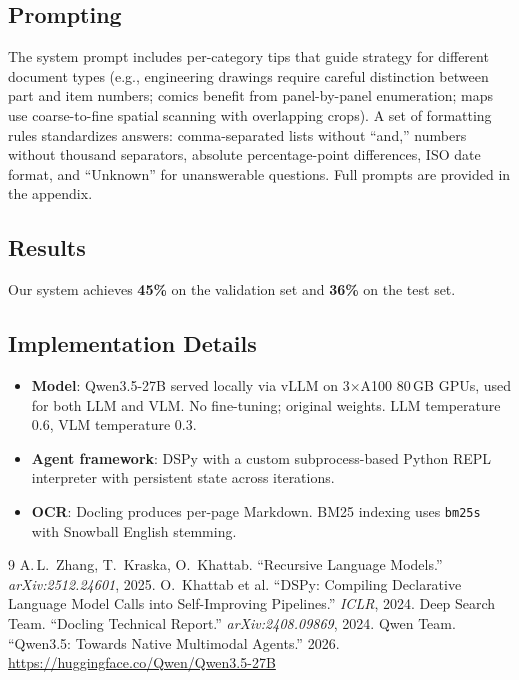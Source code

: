 \documentclass[10pt,twocolumn]{article}
\begin{document}
\subsection{Prompting}

The system prompt includes per-category tips that guide strategy for different document types (e.g., engineering drawings require careful distinction between part and item numbers; comics benefit from panel-by-panel enumeration; maps use coarse-to-fine spatial scanning with overlapping crops). A set of formatting rules standardizes answers: comma-separated lists without ``and,'' numbers without thousand separators, absolute percentage-point differences, ISO date format, and ``Unknown'' for unanswerable questions. Full prompts are provided in the appendix.

\subsection{Results}

Our system achieves \textbf{45\%} on the validation set and \textbf{36\%} on the test set.

\subsection{Implementation Details}

\begin{itemize}
  \item \textbf{Model}: Qwen3.5-27B served locally via vLLM on 3$\times$A100 80\,GB GPUs, used for both LLM and VLM. No fine-tuning; original weights. LLM temperature 0.6, VLM temperature 0.3.
  \item \textbf{Agent framework}: DSPy with a custom subprocess-based Python REPL interpreter with persistent state across iterations.
  \item \textbf{OCR}: Docling produces per-page Markdown. BM25 indexing uses \texttt{bm25s} with Snowball English stemming.
\end{itemize}

\begingroup
\footnotesize
\begin{thebibliography}{9}
 A.\,L.~Zhang, T.~Kraska, O.~Khattab. ``Recursive Language Models.'' \textit{arXiv:2512.24601}, 2025.
 O.~Khattab et al. ``DSPy: Compiling Declarative Language Model Calls into Self-Improving Pipelines.'' \textit{ICLR}, 2024.
 Deep Search Team. ``Docling Technical Report.'' \textit{arXiv:2408.09869}, 2024.
 Qwen Team. ``Qwen3.5: Towards Native Multimodal Agents.'' 2026. \url{https://huggingface.co/Qwen/Qwen3.5-27B}
\end{thebibliography}
\endgroup
\end{document}
